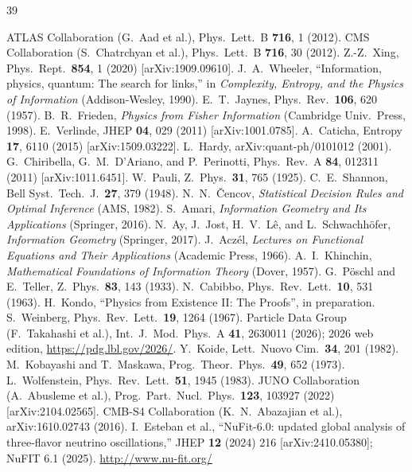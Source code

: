 \documentclass[12pt,a4paper]{article}
\begin{document}
\begin{thebibliography}{39}
\setlength{\itemsep}{1pt}
\setlength{\parskip}{0pt}

 ATLAS Collaboration (G.~Aad et al.),
  Phys.\ Lett.\ B \textbf{716}, 1 (2012).
 CMS Collaboration (S.~Chatrchyan et al.),
  Phys.\ Lett.\ B \textbf{716}, 30 (2012).
 Z.-Z.~Xing, Phys.\ Rept.\ \textbf{854}, 1 (2020) [arXiv:1909.09610].
 J.~A.~Wheeler, ``Information, physics, quantum:
  The search for links,'' in \textit{Complexity, Entropy, and the
  Physics of Information} (Addison-Wesley, 1990).
 E.~T.~Jaynes, Phys.\ Rev.\ \textbf{106}, 620 (1957).
 B.~R.~Frieden, \textit{Physics from Fisher Information}
  (Cambridge Univ.\ Press, 1998).
 E.~Verlinde, JHEP \textbf{04}, 029 (2011)
  [arXiv:1001.0785].
 A.~Caticha, Entropy \textbf{17}, 6110 (2015)
  [arXiv:1509.03222].
 L.~Hardy, arXiv:quant-ph/0101012 (2001).
 G.~Chiribella, G.~M.~D'Ariano, and P.~Perinotti,
  Phys.\ Rev.\ A \textbf{84}, 012311 (2011) [arXiv:1011.6451].
 W.~Pauli, Z.\ Phys.\ \textbf{31}, 765 (1925).
 C.~E.~Shannon, Bell Syst.\ Tech.\ J.\ \textbf{27}, 379 (1948).
 N.~N.~\v{C}encov, \textit{Statistical Decision Rules
  and Optimal Inference} (AMS, 1982).
 S.~Amari, \textit{Information Geometry and Its Applications}
  (Springer, 2016).
 N.~Ay, J.~Jost, H.~V.~L\^e, and L.~Schwachh\"ofer,
  \textit{Information Geometry} (Springer, 2017).
 J.~Acz\'el, \textit{Lectures on Functional Equations and Their Applications}
  (Academic Press, 1966).
 A.~I.~Khinchin, \textit{Mathematical Foundations of
  Information Theory} (Dover, 1957).
 G.~P\"oschl and E.~Teller,
  Z.\ Phys.\ \textbf{83}, 143 (1933).
 N.~Cabibbo, Phys.\ Rev.\ Lett.\ \textbf{10}, 531 (1963).
 H.~Kondo, ``Physics from Existence II: The Proofs'', in preparation.
 S.~Weinberg, Phys.\ Rev.\ Lett.\ \textbf{19}, 1264 (1967).
 Particle Data Group (F.~Takahashi et al.),
  Int.\ J.\ Mod.\ Phys.\ A \textbf{41}, 2630011 (2026);
  2026 web edition, \url{https://pdg.lbl.gov/2026/}.
 Y.~Koide, Lett.\ Nuovo Cim.\ \textbf{34}, 201 (1982).
 M.~Kobayashi and T.~Maskawa,
  Prog.\ Theor.\ Phys.\ \textbf{49}, 652 (1973).
 L.~Wolfenstein, Phys.\ Rev.\ Lett.\ \textbf{51}, 1945 (1983).
 JUNO Collaboration (A.~Abusleme et al.),
  Prog.\ Part.\ Nucl.\ Phys.\ \textbf{123}, 103927 (2022) [arXiv:2104.02565].
 CMB-S4 Collaboration (K.~N.~Abazajian et al.),
  arXiv:1610.02743 (2016).
 I.~Esteban et al.,   ``NuFit-6.0: updated global analysis of three-flavor neutrino oscillations,''   JHEP \textbf{12} (2024) 216   [arXiv:2410.05380]; NuFIT 6.1 (2025). \url{http://www.nu-fit.org/}


\end{thebibliography}
\end{document}

